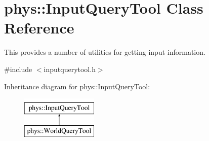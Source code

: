 \hypertarget{classphys_1_1InputQueryTool}{
\section{phys::InputQueryTool Class Reference}
\label{da/d96/classphys_1_1InputQueryTool}
}


This provides a number of utilities for getting input information.  




{\ttfamily \#include $<$inputquerytool.h$>$}

Inheritance diagram for phys::InputQueryTool:\begin{figure}[H]
\begin{center}
\leavevmode
\includegraphics[height=2.000000cm]{da/d96/classphys_1_1InputQueryTool}
\end{center}
\end{figure}
